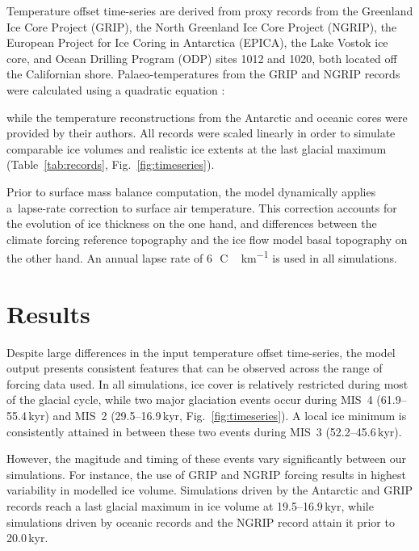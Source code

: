 Temperature offset time-series are derived from proxy records from
the Greenland Ice Core Project (GRIP), the North Greenland Ice Core Project
(NGRIP), the European Project for Ice Coring in Antarctica (EPICA), the Lake
Vostok ice core, and Ocean Drilling Program (ODP) sites 1012 and 1020, both
located off the Californian shore. Palaeo-temperatures from the GRIP and NGRIP
records were calculated using a quadratic equation \aref:


while the temperature reconstructions from the Antarctic and oceanic cores were
provided by their authors. All records were scaled linearly in
order to simulate comparable ice volumes and realistic ice extents at the last
glacial maximum (Table~\ref{tab:records}, Fig.~\ref{fig:timeseries}).

Prior to surface mass balance computation, the model dynamically applies
a~lapse-rate correction to surface air temperature. This correction accounts
for the evolution of ice thickness on the one hand, and differences between the
climate forcing reference topography and the ice flow model basal topography on
the other hand.
An annual lapse rate of 6\,\unit{{\degree}C\,km^{-1}} is used in all
simulations.


\section{Results}
\label{sec:results}

Despite large differences in the input temperature offset time-series, the
model output presents consistent features that can be observed across the range
of forcing data used. In all simulations, ice cover is relatively restricted
during most of the glacial cycle, while two major glaciation events occur
during MIS~4 (61.9--55.4\,\unit{kyr}) and MIS~2 (29.5--16.9\,\unit{kyr},
Fig.~\ref{fig:timeseries}). A local ice minimum is consistently attained in between these
two events during MIS~3 (52.2--45.6\,\unit{kyr}).

However, the magitude and timing of these events vary significantly
between our simulations. For instance, the use of GRIP and NGRIP forcing
results in highest variability in modelled ice volume. Simulations driven by
the Antarctic and GRIP records reach a last glacial maximum in ice volume at
19.5--16.9\,\unit{kyr}, while simulations driven by oceanic records
and the NGRIP record attain it prior to 20.0\,\unit{kyr}.


